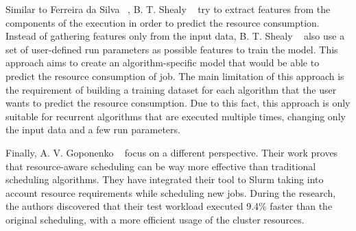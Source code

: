 Similar to Ferreira da Silva \etal~\cite{ferreira2013}, B. T. Shealy \etal~\cite{shealy2021} try to extract features from the components of the execution in order to predict the resource consumption.
Instead of gathering features only from the input data, B. T. Shealy \etal~\cite{shealy2021} also use a set of user-defined run parameters as possible features to train the model.
This approach aims to create an algorithm-specific model that would be able to predict the resource consumption of job.
The main limitation of this approach is the requirement of building a training dataset for each algorithm that the user wants to predict the resource consumption.
Due to this fact, this approach is only suitable for recurrent algorithms that are executed multiple times, changing only the input data and a few run parameters.

Finally, A. V. Goponenko \etal~\cite{goponenko2020} focus on a different perspective.
Their work proves that resource-aware scheduling can be way more effective than traditional scheduling algorithms.
They have integrated their tool to Slurm taking into account resource requirements while scheduling new jobs.
During the research, the authors discovered that their test workload executed 9.4\% faster than the original scheduling, with a more efficient usage of the cluster resources.
